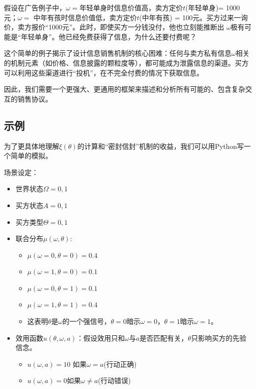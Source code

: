 假设在广告例子中，$\omega=$年轻单身时信息价值高，卖方定价$t$(年轻单身)= 1000元；$\omega=$
中年有孩时信息价值低，卖方定价$t$(中年有孩) = 100元。买方过来一询价，卖方报价“1000元”。此时，即使买方一分钱没付，他也立刻能推断出
$\omega$极有可能是“年轻单身”。他已经免费获得了信息，为什么还要付费呢？

这个简单的例子揭示了设计信息销售机制的核心困难：任何与卖方私有信息$\omega$相关的机制元素（如价格、信息披露的颗粒度等），都可能成为泄露信息的渠道。买方可以利用这些渠道进行“投机”，在不完全付费的情况下获取信息。

因此，我们需要一个更强大、更通用的框架来描述和分析所有可能的、包含复杂交互的销售协议。

\subsection{示例}

为了更具体地理解$\xi(\theta)$的计算和“密封信封”机制的收益，我们可以用Python写一个简单的模拟。

场景设定：
\begin{itemize}
    \item 世界状态$\Omega={0,1}$
    \item 买方状态$A={0,1}$
    \item 买方类型$\Theta={0,1}$
    \item 联合分布$\mu(\omega,\theta)$:
       \begin{itemize}
          \item $\mu(\omega=0,\theta=0)=0.4$
          \item $\mu(\omega=1,\theta=0)=0.1$
          \item $\mu(\omega=0,\theta=1)=0.1$
          \item $\mu(\omega=1,\theta=1)=0.4$
          \item 这表明$\theta$是$\omega$的一个强信号，$\theta=0$暗示$\omega=0$，$\theta=1$暗示$\omega=1$。
       \end{itemize}
    \item 效用函数$u(\theta,\omega,a)$：假设效用只和$\omega$与$a$是否匹配有关，$\theta$只影响买方的先验信念。
       \begin{itemize}
          \item $u(\omega,a)=10$ 如果$\omega=a$(行动正确)
          \item $u(\omega,a)=0$如果$\omega\neq a$(行动错误)
       \end{itemize}
\end{itemize}


